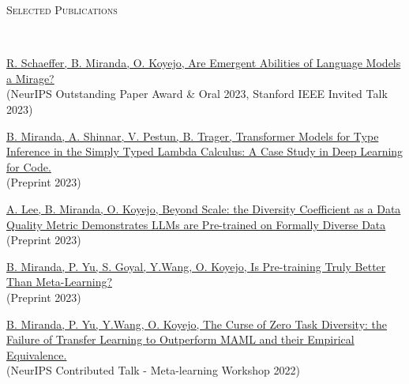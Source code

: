 \documentclass{article}
\newenvironment{changemargin}[2]{%
  \begin{list}{}{%
    \setlength{\topsep}{0pt}%
    \setlength{\leftmargin}{#1}%
    \setlength{\rightmargin}{#2}%
    \setlength{\listparindent}{\parindent}%
    \setlength{\itemindent}{\parindent}%
    \setlength{\parsep}{\parskip}%
  }%
  \item[]}{\end{list}
}
\newcommand{\lineover}{
	\begin{changemargin}{-0.05in}{-0.05in}
		\vspace*{-8pt}
		\hrulefill \\
		\vspace*{-2pt}
	\end{changemargin}
}
\newcommand{\header}[1]{
	\begin{changemargin}{-0.5in}{-0.5in}
		\scshape{#1}\\
  	\lineover
	\end{changemargin}
}
\newenvironment{body} {
	\vspace*{-16pt}
	\begin{changemargin}{-0.25in}{-0.5in}
  }	
	{\end{changemargin}
}
\begin{document}
\newpage

\header{Selected Publications}
\begin{body}
    \vspace{4pt} %

    \vspace{10pt}
    \href{https://arxiv.org/abs/2304.15004}
    {R. Schaeffer, B. Miranda, O. Koyejo, 
    Are Emergent Abilities of Language Models a Mirage?}
    \\
    (NeurIPS Outstanding Paper Award \& Oral 2023, Stanford IEEE Invited Talk 2023)


    \vspace{10pt}
    \href{https://drive.google.com/file/d/1J_URheXRr5vbYxiSeDb1R9fKA7cLy-nj/view?usp=sharing, https://github.com/FormalML/type-parametric-synthesis}
    {B. Miranda, A. Shinnar, V. Pestun, B. Trager, 
    Transformer Models for Type Inference in the Simply Typed Lambda Calculus: A Case Study in Deep Learning for Code.}
    \\
    (Preprint 2023)

    \vspace{10pt}
    \href{https://arxiv.org/abs/2306.13840}
    {A. Lee, B. Miranda, O. Koyejo,
    Beyond Scale: the Diversity Coefficient as a Data Quality Metric Demonstrates LLMs are Pre-trained on Formally Diverse Data}
    \\
    (Preprint 2023)

    \vspace{10pt}
    \href{https://arxiv.org/abs/2306.13841}
    {B. Miranda, P. Yu, S. Goyal, Y.Wang, O. Koyejo,
    Is Pre-training Truly Better Than Meta-Learning?}
    \\
    (Preprint 2023)
    
    \vspace{10pt}
    \href{https://arxiv.org/abs/2208.01545}{B. Miranda, P. Yu, Y.Wang, O. Koyejo,
    The Curse of Zero Task Diversity: the Failure of Transfer Learning to Outperform MAML and their Empirical Equivalence.}
    \\
    (NeurIPS Contributed Talk - Meta-learning Workshop 2022)
    

\end{body}
\end{document}
